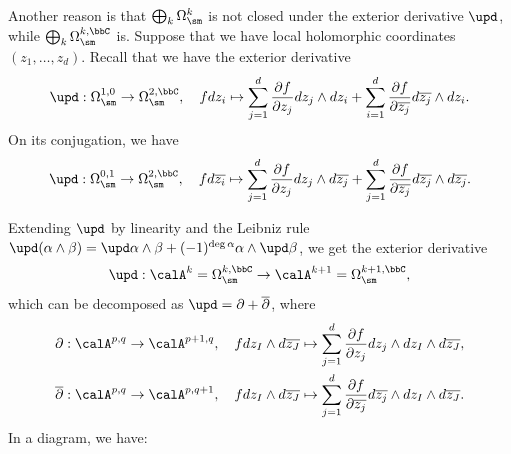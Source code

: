 Another reason  is that \(\bigoplus_k \Omega_{\sm}^{k}\) is not closed under the exterior derivative \(\upd\), while \(\bigoplus_k \Omega_{\sm}^{k,\bbC}\) is.
Suppose that we have local holomorphic coordinates \((z_1, \ldots, z_d)\).
Recall that we have the exterior derivative
\[ \upd: \Omega_{\sm}^{1,0} \to \Omega_{\sm}^{2,\bbC}, \quad f d z_{i} \mapsto \sum_{j=1}^d \frac{\partial f}{\partial z_j} d z_j \wedge d z_{i} + \sum_{i=1}^d \frac{\partial f}{\partial \overline{z_j}} d \overline{z_j} \wedge d z_{i}. \]
On its conjugation, we have
\[ \upd: \Omega_{\sm}^{0,1} \to \Omega_{\sm}^{2,\bbC}, \quad f d \overline{z_{i}} \mapsto \sum_{j=1}^d \frac{\partial f}{\partial z_j} d z_j \wedge d \overline{z_{j}} + \sum_{j=1}^d \frac{\partial f}{\partial \overline{z_j}} d \overline{z_j} \wedge d \overline{z_{j}}. \]

Extending \(\upd\) by linearity and the Leibniz rule \(\upd(\alpha \wedge \beta) = \upd \alpha \wedge \beta + (-1)^{\deg \alpha} \alpha \wedge \upd \beta\), we get the exterior derivative
\[ \upd: \calA^k = \Omega_{\sm}^{k,\bbC} \to \calA^{k+1} = \Omega_{\sm}^{k+1,\bbC}, \]
which can be decomposed as \(\upd = \partial + \overline{\partial}\), where
\begin{align*}
	\partial: \calA^{p,q}            & \to \calA^{p+1,q}, \quad f d z_I \wedge d \overline{z_J} \mapsto \sum_{j=1}^d \frac{\partial f}{\partial z_j} d z_j \wedge d z_I \wedge d \overline{z_J},                       \\
	\overline{\partial}: \calA^{p,q} & \to \calA^{p,q+1}, \quad f d z_I \wedge d \overline{z_J} \mapsto \sum_{j=1}^d \frac{\partial f}{\partial \overline{z_j}} d \overline{z_j} \wedge d z_I \wedge d \overline{z_J}.
\end{align*}
In a diagram, we have:
\begin{center}
\end{center}

